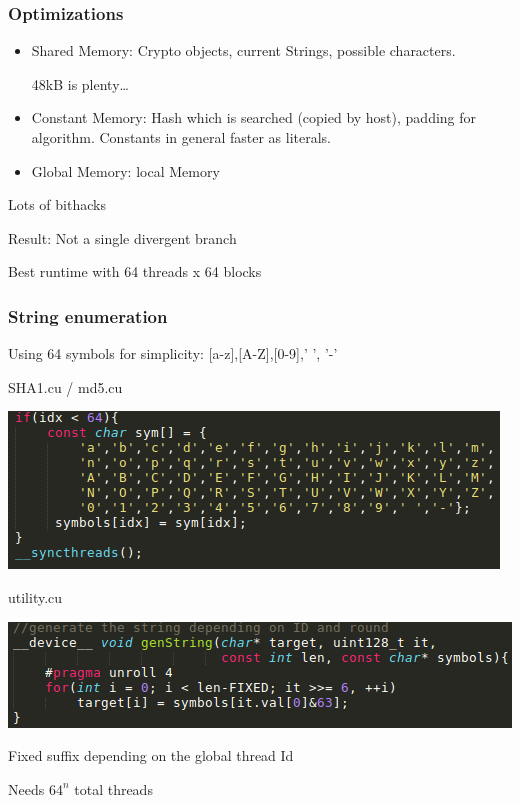 \documentclass{beamer}
\begin{document}

\begin{frame}
	\frametitle{Optimizations}
	\begin{itemize}
		\item{Shared Memory:}
			Crypto objects, current Strings, possible characters.

			48kB is plenty\dots
		\item{Constant Memory:}
			Hash which is searched (copied by host), padding for algorithm. Constants in general faster as literals.
		\item{Global Memory:}
			local Memory
	\end{itemize}

	\vspace{1em}
	Lots of bithacks

	Result: Not a single divergent branch

	\vspace{1em}
	Best runtime with 64 threads x 64 blocks
\end{frame}


\begin{frame}
	\frametitle{String enumeration}
	Using 64 symbols for simplicity: [a-z],[A-Z],[0-9],' ', '-'

	\begin{center}
		SHA1.cu / md5.cu

		\includegraphics[width=.6\textwidth]{symbols.png}

		utility.cu

		\includegraphics[width=.6\textwidth]{stringGeneration.png}
	\end{center}

	Fixed suffix depending on the global thread Id

	Needs $64^n$ total threads

\end{frame}

\end{document}
